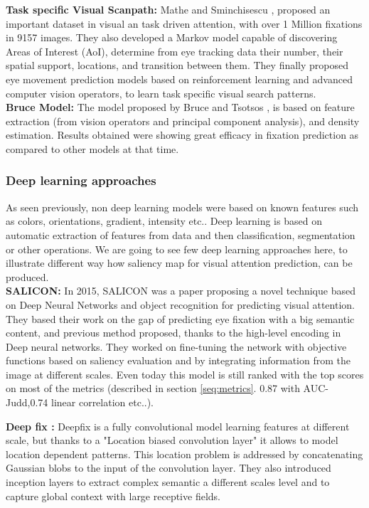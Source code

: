 \textbf{Task specific Visual Scanpath:  }Mathe and Sminchisescu \cite{NIPS2013_5196}, proposed an important dataset in visual an task driven attention, with over 1 Million fixations in 9157 images. They also developed a Markov model capable of discovering Areas of Interest (AoI), determine from eye tracking data their number, their spatial support, locations, and transition between them. They finally proposed eye movement prediction models based on reinforcement learning and advanced computer vision operators, to learn task specific visual search patterns. \\

\textbf{Bruce Model:  }The model proposed by Bruce and Tsotsos \cite{doi:10.1167/9.3.5}, is based on feature extraction (from vision operators and principal component analysis), and density estimation. Results obtained were showing great efficacy in fixation prediction as compared to other models at that time.

\subsubsection{Deep learning approaches} \label{subsub:deeplearning}
As seen previously, non deep learning models were based on known features such as colors, orientations, gradient, intensity etc.. Deep learning is based on automatic extraction of features from data and then classification, segmentation or other operations. We are going to see few deep learning approaches here, to illustrate different way  how saliency map for visual attention prediction, can be produced.\\

\textbf{SALICON:  }In 2015, SALICON \cite{7410395} was a paper proposing a novel technique based on Deep Neural Networks and object recognition for predicting visual attention. They based their work on the gap of predicting eye fixation with a big semantic content, and previous method proposed, thanks to the high-level encoding in Deep neural networks. They worked on fine-tuning the network with objective functions based on saliency evaluation and by integrating information from the image at different scales. Even today this model is still ranked with the top scores on most of the metrics (described in section \ref{seq:metrics}. 0.87 with AUC-Judd,0.74 linear correlation etc..).

\textbf{Deep fix :  }Deepfix \cite{DBLP:journals/corr/KruthiventiAB15} is a fully convolutional model learning features at different scale, but thanks to a "Location biased convolution layer" it allows to model location dependent patterns. This location problem is addressed by concatenating Gaussian blobs to the input of the convolution layer. They also introduced inception layers to extract complex semantic a different scales level and  to capture global context with large receptive fields.\\


